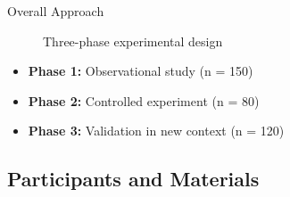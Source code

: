 \documentclass[aspectratio=169,11pt]{beamer}
\begin{document}
\begin{frame}{Overall Approach}
  \begin{figure}
    \centering
    \caption{Three-phase experimental design}
  \end{figure}
  
  \begin{itemize}
    \item \textbf{Phase 1:} Observational study (n = 150)
    \item \textbf{Phase 2:} Controlled experiment (n = 80)
    \item \textbf{Phase 3:} Validation in new context (n = 120)
  \end{itemize}
\end{frame}

\subsection{Participants and Materials}
\end{document}

